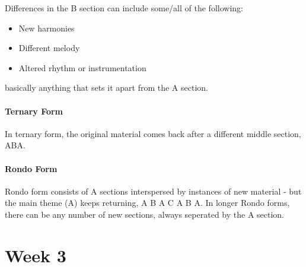 \documentclass[12pt, a4paper]{report}
\begin{document}
  Differences in the B section can include some/all of the following:

  \begin{itemize}
    \item New harmonies
    \item Different melody
    \item Altered rhythm or instrumentation
  \end{itemize}

  basically anything that sets it apart from the A section.

  \subsection{Ternary Form}

  In ternary form, the original material comes back after a different middle section, ABA.

  \subsection{Rondo Form}

  Rondo form consists of A sections interspersed by instances of new material - but the main theme (A) keeps returning, A B A C A B A. In longer Rondo forms, there can be any number of new sections, always seperated by the A section.








  \part{Week 3}
\end{document}
